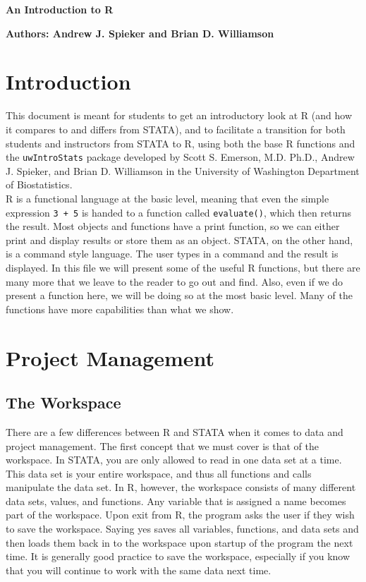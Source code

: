 \documentclass[11pt,letterpaper,fleqn]{report}
\begin{document}
\centerline{\textbf{\Large{An Introduction to R}}}
\centerline{\textbf{Authors: Andrew J. Spieker and Brian D. Williamson}}
\tableofcontents

\chapter{Introduction}
This document is meant for students to get an introductory look at R (and how it compares to and differs from STATA), and to facilitate a transition for both students and instructors from STATA to R, using both the base R functions and the \texttt{uwIntroStats} package developed by Scott S. Emerson, M.D. Ph.D., Andrew J. Spieker, and Brian D. Williamson in the University of Washington Department of Biostatistics.\\

R is a functional language at the basic level, meaning that even the simple expression \texttt{3 + 5} is handed to a function called \texttt{evaluate()}, which then returns the result. Most objects and functions have a print function, so we can either print and display results or store them as an object. STATA, on the other hand, is a command style language. The user types in a command and the result is displayed. In this file we will present some of the useful R functions, but there are many more that we leave to the reader to go out and find. Also, even if we do present a function here, we will be doing so at the most basic level. Many of the functions have more capabilities than what we show.

\chapter{Project Management}
\section{The Workspace}
There are a few differences between R and STATA when it comes to data and project management. The first concept that we must cover is that of the workspace. In STATA, you are only allowed to read in one data set at a time. This data set is your entire workspace, and thus all functions and calls manipulate the data set. In R, however, the workspace consists of many different data sets, values, and functions. Any variable that is assigned a name becomes part of the workspace. Upon exit from R, the program asks the user if they wish to save the workspace. Saying yes saves all variables, functions, and data sets and then loads them back in to the workspace upon startup of the program the next time. It is generally good practice to save the workspace, especially if you know that you will continue to work with the same data next time.
\end{document}
